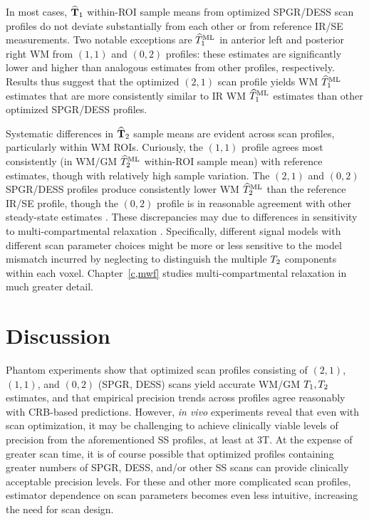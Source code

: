In most cases, $\widehat{\mathbf{T}}_1$ within-ROI sample means 
from optimized SPGR/DESS scan profiles 
do not deviate substantially from each other 
or from reference IR/SE measurements.
Two notable exceptions are $\widehat{T}_1^\mathrm{ML}$ 
in anterior left and posterior right WM 
from $(1,1)$ and $(0,2)$ profiles: 
these estimates are significantly lower and higher 
than analogous estimates from other profiles, respectively.
Results thus suggest that the optimized $(2,1)$ scan profile 
yields WM $\widehat{T}_1^\mathrm{ML}$ estimates 
that are more consistently similar to IR WM $\widehat{T}_1^\mathrm{ML}$ estimates 
than other optimized SPGR/DESS profiles.

Systematic differences in $\widehat{\mathbf{T}}_2$ sample means 
are evident across scan profiles, 
particularly within WM ROIs.
Curiously, the $(1,1)$ profile agrees most consistently 
(in WM/GM $\widehat{T}_2^\mathrm{ML}$ within-ROI sample mean) 
with reference estimates, 
though with relatively high sample variation.
The $(2,1)$ and $(0,2)$ SPGR/DESS profiles 
produce consistently lower WM $\widehat{T}_2^\mathrm{ML}$ 
than the reference IR/SE profile, 
though the $(0,2)$ profile is in reasonable agreement 
with other steady-state estimates \cite{heule:14:tes-nib}.
These discrepancies may due to differences 
in sensitivity to multi-compartmental relaxation \cite{mackay:94:ivv}.
Specifically, different signal models 
with different scan parameter choices 
might be more or less sensitive 
to the model mismatch incurred 
by neglecting to distinguish 
the multiple $T_2$ components within each voxel.
Chapter~\ref{c,mwf} studies multi-compartmental relaxation 
in much greater detail.

\section{Discussion}
\label{s,scn-dsgn,disc}

Phantom experiments show 
that optimized scan profiles consisting 
of $(2,1)$, $(1,1)$, and $(0,2)$ (SPGR, DESS) scans 
yield accurate WM/GM $T_1,T_2$ estimates, 
and that empirical precision trends across profiles agree reasonably 
with CRB-based predictions.
However, \emph{in vivo} experiments reveal 
that even with scan optimization, 
it may be challenging to achieve clinically viable levels 
of precision from the aforementioned SS profiles, at least at 3T. 
At the expense of greater scan time, 
it is of course possible that optimized profiles 
containing greater numbers of SPGR, DESS, and/or other SS scans 
can provide clinically acceptable precision levels.
For these and other more complicated scan profiles, 
estimator dependence on scan parameters becomes even less intuitive, 
increasing the need for scan design.

